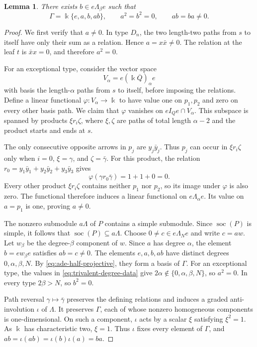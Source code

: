 \documentclass[a4paper,11pt,reqno]{amsart}
\newtheorem{lemma}[lemma]{Lemma}
\theoremstyle{definition}
\theoremstyle{plain}
\numberwithin{equation}{section}
\newcommand{\kk}{\Bbbk}
\begin{document}
\begin{lemma}
\label{lem:trivalent-local-algebra}
There exists \(b\in e\Lambda_\beta e\) such that
\[
 \Gamma=\kk\{e,a,b,ab\},\qquad
 a^2=b^2=0,\qquad ab=ba\ne0.
\]
\end{lemma}

\begin{proof}
We first verify that \(a\ne0\).  In type \(D_n\), the two
length-two paths from \(s\) to itself have only their sum as a
relation.  Hence \(a=x\bar x\ne0\).  The relation at the leaf
\(t\) is \(\bar x x=0\), and therefore \(a^2=0\).

For an exceptional type, consider the vector space
\[
 V_\alpha=e(\kk\overline Q)_\alpha e
\]
with basis the length-\(\alpha\) paths from \(s\) to itself,
before imposing the relations.  Define a linear functional
\(\varphi:V_\alpha\to\kk\) to have value one on
\(p_1,p_2\) and zero on every other basis path.
We claim that \(\varphi\) vanishes on \(eI_Qe\cap V_\alpha\).
This subspace is spanned by products \(\xi r_i\zeta\), where
\(\xi,\zeta\) are paths of total length \(\alpha-2\) and the
product starts and ends at \(s\).

The only consecutive opposite arrows in \(p_j\) are
\(y_j\bar y_j\).  Thus \(p_j\) can occur in
\(\xi r_i\zeta\) only when \(i=0\),
\(\xi=\gamma\), and \(\zeta=\bar\gamma\).
For this product, the relation
\(r_0=y_1\bar y_1+y_2\bar y_2+y_3\bar y_3\) gives
\[
 \varphi(\gamma r_0\bar\gamma)=1+1+0=0.
\]
Every other product \(\xi r_i\zeta\) contains neither
\(p_1\) nor \(p_2\), so its image under \(\varphi\) is also
zero.  The functional therefore induces a linear functional on
\(e\Lambda_\alpha e\).  Its value on \(a=p_1\) is one,
proving \(a\ne0\).

The nonzero submodule \(a\Lambda\) of \(P\) contains a simple
submodule.  Since \(\operatorname{soc}(P)\) is simple, it follows
that \(\operatorname{soc}(P)\subseteq a\Lambda\).
Choose \(0\ne c\in e\Lambda_Ne\) and write \(c=aw\).
Let \(w_\beta\) be the degree-\(\beta\) component of \(w\).
Since \(a\) has degree \(\alpha\), the element
\(b=ew_\beta e\) satisfies \(ab=c\ne0\).
The elements \(e,a,b,ab\) have distinct degrees
\(0,\alpha,\beta,N\).  By \eqref{eq:ade-half-projective},
they form a basis of \(\Gamma\).
For an exceptional type, the values in
\eqref{eq:trivalent-degree-data} give
\(2\alpha\notin\{0,\alpha,\beta,N\}\), so \(a^2=0\).
In every type \(2\beta>N\), so \(b^2=0\).

Path reversal \(\gamma\mapsto\bar\gamma\) preserves the
defining relations and induces a graded anti-involution \(\iota\)
of \(\Lambda\).  It preserves \(\Gamma\), each of whose nonzero
homogeneous components is one-dimensional.  On such a component,
\(\iota\) acts by a scalar \(\xi\) satisfying \(\xi^2=1\).
As \(\kk\) has characteristic two, \(\xi=1\).
Thus \(\iota\) fixes every element of \(\Gamma\), and
\(ab=\iota(ab)=\iota(b)\iota(a)=ba\).
\end{proof}
\end{document}
